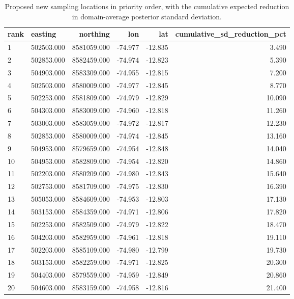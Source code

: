 \begin{table}[htbp]
\centering
\caption{Proposed new sampling locations in priority order, with the cumulative expected reduction in domain-average posterior standard deviation.}
\label{tab:proposed}
\footnotesize
\begin{tabular}{llrrrr}
\toprule
rank & easting & northing & lon & lat & cumulative\_sd\_reduction\_pct \\
\midrule
1 & 502503.000 & 8581059.000 & -74.977 & -12.835 & 3.490 \\
2 & 502853.000 & 8582459.000 & -74.974 & -12.823 & 5.390 \\
3 & 504903.000 & 8583309.000 & -74.955 & -12.815 & 7.200 \\
4 & 502503.000 & 8580009.000 & -74.977 & -12.845 & 8.770 \\
5 & 502253.000 & 8581809.000 & -74.979 & -12.829 & 10.090 \\
6 & 504303.000 & 8583009.000 & -74.960 & -12.818 & 11.260 \\
7 & 503003.000 & 8583059.000 & -74.972 & -12.817 & 12.230 \\
8 & 502853.000 & 8580009.000 & -74.974 & -12.845 & 13.160 \\
9 & 504953.000 & 8579659.000 & -74.954 & -12.848 & 14.040 \\
10 & 504953.000 & 8582809.000 & -74.954 & -12.820 & 14.860 \\
11 & 502203.000 & 8580209.000 & -74.980 & -12.843 & 15.640 \\
12 & 502753.000 & 8581709.000 & -74.975 & -12.830 & 16.390 \\
13 & 505053.000 & 8584609.000 & -74.953 & -12.803 & 17.130 \\
14 & 503153.000 & 8584359.000 & -74.971 & -12.806 & 17.820 \\
15 & 502253.000 & 8582509.000 & -74.979 & -12.822 & 18.470 \\
16 & 504203.000 & 8582959.000 & -74.961 & -12.818 & 19.110 \\
17 & 502203.000 & 8585109.000 & -74.980 & -12.799 & 19.730 \\
18 & 503153.000 & 8582259.000 & -74.971 & -12.825 & 20.300 \\
19 & 504403.000 & 8579559.000 & -74.959 & -12.849 & 20.860 \\
20 & 504603.000 & 8583159.000 & -74.958 & -12.816 & 21.400 \\
\bottomrule
\end{tabular}
\end{table}
